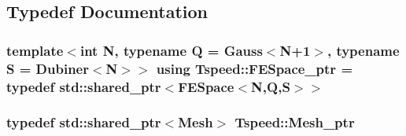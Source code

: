 \subsection{Typedef Documentation}
\hypertarget{namespaceTspeed_a05fcb57094666c8f5ab1e90d1a6fecf8}{
\subsubsection[{F\-E\-Space\-\_\-ptr}]{\setlength{\rightskip}{0pt plus 5cm}template$<$int N, typename Q  = Gauss$<$\-N+1$>$, typename S  = Dubiner$<$\-N$>$$>$ using {\bf Tspeed\-::\-F\-E\-Space\-\_\-ptr} = typedef std\-::shared\-\_\-ptr$<${\bf F\-E\-Space}$<$N,Q,S$>$$>$}}\label{namespaceTspeed_a05fcb57094666c8f5ab1e90d1a6fecf8}
\hypertarget{namespaceTspeed_a7367a01365c4cc2c1a09305b3effc4e8}{
\subsubsection[{Mesh\-\_\-ptr}]{\setlength{\rightskip}{0pt plus 5cm}typedef std\-::shared\-\_\-ptr$<${\bf Mesh}$>$ {\bf Tspeed\-::\-Mesh\-\_\-ptr}}}\label{namespaceTspeed_a7367a01365c4cc2c1a09305b3effc4e8}


